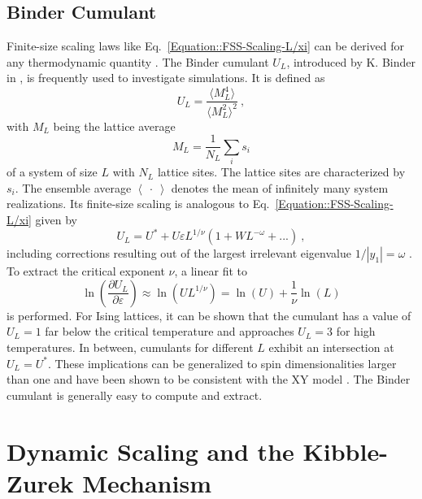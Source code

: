 	\subsection{Binder Cumulant} \label{Sec::Binder-Cumulant}
	Finite-size scaling laws like Eq.~\eqref{Equation::FSS-Scaling-L/xi} can be derived for any thermodynamic quantity \cite{pelissetto2002critical, blote1995ising}. The Binder cumulant $U_L$, introduced by K. Binder in \cite{binder1981finite}, is frequently used to investigate simulations. It is defined as
	\begin{equation} \label{Eq::Def-Binder-Cum}
		U_L =	\frac{\langle M_L^4 \rangle}{\langle M_L^2 \rangle^2}~,
	\end{equation}
	with $M_L$ being the lattice average 
	\begin{equation} \label{Eq::lattice-average}
		M_L	=	\frac{1}{{N_L}} \sum_i s_i
	\end{equation}
	of a system of size $L$ with $N_L$ lattice sites. The lattice sites are characterized by $s_i$. The ensemble average $\left\langle~\cdot~\right \rangle$ denotes the mean of infinitely many system realizations. Its finite-size scaling is analogous to Eq.~\eqref{Equation::FSS-Scaling-L/xi} given by
	\begin{equation}
		U_L =	U^* + U \varepsilon L^{1/\nu} \left(1 + W L^{-\omega} + ...\right)~,
	\end{equation}
	including corrections resulting out of the largest irrelevant eigenvalue $1/|y_1| =	\omega $ \cite{campostrini2001critical}.
	To extract the critical exponent $\nu$, a linear fit to
	\begin{equation} \label{Eq::FSS-dU_dT}
		\ln \left(\frac{\partial U_L}{\partial \varepsilon}\right) \approx	\ln \left(U L^{1/\nu} \right) =	\ln (U) + \frac{1}{\nu} \ln (L)
	\end{equation}
	is performed. For Ising lattices, it can be shown \cite{binder1981finite} that the cumulant has a value of $U_L=1$ far below the critical temperature and approaches $U_L =	3$ for high temperatures. In between, cumulants for different $L$ exhibit an intersection at $U_L =	U^*$. These implications can be generalized to spin dimensionalities larger than one \cite{binder1981critical} and have been shown to be consistent with the XY model \cite{landau1983non, bernreuther1988investigation}. The Binder cumulant is generally easy to compute and extract.
	\section{Dynamic Scaling and the Kibble-Zurek Mechanism} \label{Section::Dynamic-Scaling}
